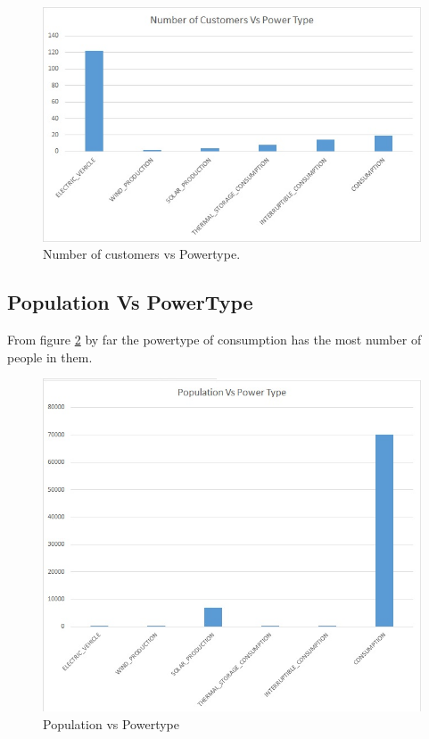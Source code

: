 \begin{figure}[h!]
  \includegraphics[width=\linewidth]{4-customer-vs-powertype.jpg}
  \caption{Number of customers vs Powertype.}
  \label{fig:cust-pt}
\end{figure}


\subsection {Population Vs PowerType}
From figure \ref{fig:pop-pt} by far the powertype of consumption has the most number of people in them.
\begin{figure}[h!]
  \includegraphics[width=\linewidth]{2-population-vs-powertype.jpg}
  \caption{Population vs Powertype}
  \label{fig:pop-pt}
\end{figure}


